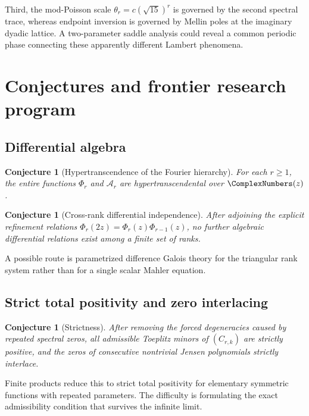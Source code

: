 \documentclass[11pt,oneside]{article}
\newtheorem{conjecture}[theorem]{Conjecture}
\theoremstyle{definition}
\theoremstyle{remark}
\newcommand{\Ar}{\mathcal A}
\begin{document}
Third, the mod-Poisson scale $\theta_r=c(\sqrt{15})^r$ is governed by the
second spectral trace, whereas endpoint inversion is governed by Mellin poles
at the imaginary dyadic lattice.  A two-parameter saddle analysis could reveal
a common periodic phase connecting these apparently different Lambert
phenomena.

\section{Conjectures and frontier research program}

\subsection{Differential algebra}

\begin{conjecture}[Hypertranscendence of the Fourier hierarchy]
For each $r\geq1$, the entire functions $\Phi_r$ and $\Ar_r$ are
hypertranscendental over $\ComplexNumbers(z)$.
\end{conjecture}

\begin{conjecture}[Cross-rank differential independence]
After adjoining the explicit refinement relations
$\Phi_r(2z)=\Phi_r(z)\Phi_{r-1}(z)$, no further algebraic differential
relations exist among a finite set of ranks.
\end{conjecture}

A possible route is parametrized difference Galois theory for the triangular
rank system rather than for a single scalar Mahler equation.

\subsection{Strict total positivity and zero interlacing}

\begin{conjecture}[Strictness]
After removing the forced degeneracies caused by repeated spectral zeros,
all admissible Toeplitz minors of $(C_{r,k})$ are strictly positive, and the
zeros of consecutive nontrivial Jensen polynomials strictly interlace.
\end{conjecture}

Finite products reduce this to strict total positivity for elementary
symmetric functions with repeated parameters.  The difficulty is formulating
the exact admissibility condition that survives the infinite limit.
\end{document}
